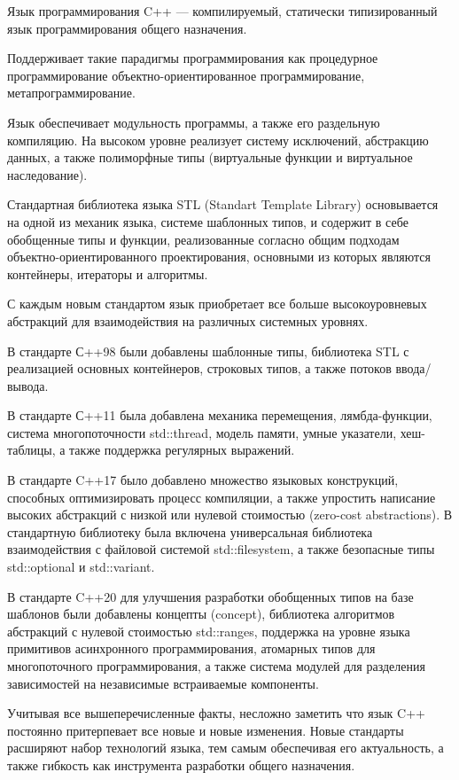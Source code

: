 
Язык программирования C++ --- компилируемый, статически
типизированный язык программирования общего назначения.

Поддерживает такие парадигмы программирования как
процедурное программирование
объектно-ориентированное программирование,
метапрограммирование.

Язык обеспечивает модульность программы, а также его раздельную
компиляцию. На высоком уровне реализует систему исключений,
абстракцию данных, а также полиморфные типы
(виртуальные функции и виртуальное наследование).

Стандартная библиотека языка STL (Standart Template Library)
основывается на одной из механик языка, системе шаблонных типов,
и содержит в себе обобщенные типы и функции, 
реализованные согласно общим подходам
объектно-ориентированного проектирования,
основными из которых являются
контейнеры, итераторы и алгоритмы.

С каждым новым стандартом язык приобретает все больше высокоуровневых
абстракций для взаимодействия на различных системных уровнях.

В стандарте С++98 были добавлены шаблонные типы,
библиотека STL с реализацией основных контейнеров,
строковых типов, а также потоков ввода/вывода.

В стандарте С++11 была добавлена механика перемещения,
лямбда-функции, система многопоточности std::thread,
модель памяти, умные указатели, хеш-таблицы,
а также поддержка регулярных выражений.

В стандарте C++17 было добавлено множество языковых конструкций,
способных оптимизировать процесс компиляции,
а также упростить написание высоких абстракций с низкой или 
нулевой стоимостью (zero-cost abstractions).
В стандартную библиотеку была включена универсальная библиотека 
взаимодействия с файловой системой std::filesystem,
а также безопасные типы std::optional и std::variant.

В стандарте C++20 для улучшения разработки
обобщенных типов на базе шаблонов были добавлены концепты (concept),
библиотека алгоритмов абстракций с нулевой стоимостью std::ranges,
поддержка на уровне языка примитивов асинхронного программирования,
атомарных типов для многопоточного программирования,
а также система модулей для разделения зависимостей на независимые
встраиваемые компоненты.

Учитывая все вышеперечисленные факты, несложно заметить
что язык C++ постоянно притерпевает все новые и новые изменения.
Новые стандарты расширяют набор технологий языка, 
тем самым обеспечивая его актуальность, 
а также гибкость как инструмента разработки общего назначения. 

